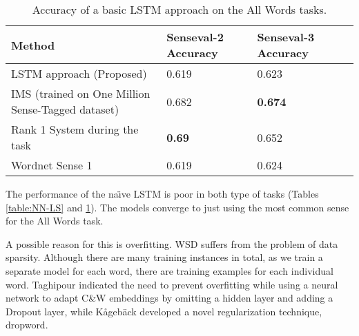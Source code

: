 \begin{table}[th]
	\caption{Accuracy of a basic LSTM approach on the All Words tasks.}
	\label{table:NN_AW}
	\begin{center}
		\begin{tabular}{| p{7cm} | p{2cm} | p{2cm} | p{2cm} | }
			\hline
			Method & Senseval-2 Accuracy & Senseval-3 Accuracy\\
			\hline
			LSTM approach (Proposed) & 0.619  & 0.623  \\
			
			\hline
			IMS (trained on One Million Sense-Tagged dataset) & 0.682 & {\bf0.674} \\
			\hline
			Rank 1 System during the task & {\bf0.69} & 0.652  \\
			\hline
			Wordnet Sense 1 & 0.619 & 0.624  \\
			\hline
		\end{tabular}
	\end{center}
\end{table}

The performance of the na\"{\i}ve LSTM is poor in both type of tasks (Tables
\ref{table:NN-LS} and \ref{table:NN_AW}). The models converge to just
using the most common sense for the All Words task. 


A possible reason for this is overfitting. WSD suffers
from the problem of data sparsity. Although there are many training
instances in total, as we train a separate model for each word, there are training examples for each
individual word. Taghipour  indicated the need to prevent overfitting while using a neural network to adapt C\&W embeddings by omitting a hidden layer and adding a Dropout layer, while K{\aa}geb{\"a}ck  developed a novel regularization technique, dropword.

